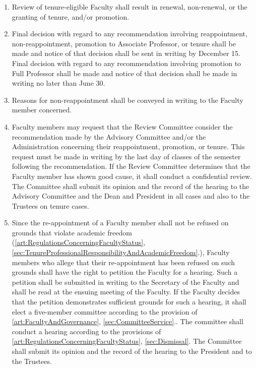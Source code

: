 \documentclass{manual}
\newcommand{\itemLevelA}{\alph*.}
\newcommand{\itemRefA}{\alph*}
\begin{document}
				\begin{enumerate}[label=\itemLevelA,ref=\itemRefA]
				\item Review of tenure-eligible Faculty shall result in renewal, non-renewal, or the granting of tenure, and/or promotion.
				\item Final decision with regard to any recommendation involving reappointment, non-reappointment, promotion to Associate Professor, or tenure shall be made and notice of that decision shall be sent in writing by December 15. Final decision with regard to any recommendation involving promotion to Full Professor shall be made and notice of that decision shall be made in writing no later than June 30. 
				\item Reasons for non-reappointment shall be conveyed in writing to the Faculty member concerned.
				\item Faculty members may request that the Review Committee consider the recommendation made by the Advisory Committee and/or the Administration concerning their reappointment, promotion, or tenure. This request must be made in writing by the last day of classes of the semester following the recommendation. If the Review Committee determines that the Faculty member has shown good cause, it shall conduct a confidential review. The Committee shall submit its opinion and the record of the hearing to the Advisory Committee and the Dean and President in all cases and also to the Trustees on tenure cases.
				\item Since the re-appointment of a Faculty member shall not be refused on grounds that violate academic freedom (\cref{art:RegulationsConcerningFacultyStatus}, \cref{sec:TenureProfessionalResponsibilityAndAcademicFreedom}.), Faculty members who allege that their re-appointment has been refused on such grounds shall have the right to petition the Faculty for a hearing. Such a petition shall be submitted in writing to the Secretary of the Faculty and shall be read at the ensuing meeting of the Faculty. If the Faculty decides that the petition demonstrates sufficient grounds for such a hearing, it shall elect a five-member committee according to the provision of \cref{art:FacultyAndGovernance}, \cref{sec:CommitteeService}.. The committee shall conduct a hearing according to the provisions of \cref{art:RegulationsConcerningFacultyStatus}, \cref{sec:Dismissal}. The Committee shall submit its opinion and the record of the hearing to the President and to the Trustees.
				\end{enumerate}
\end{document}
